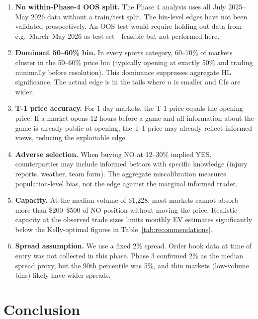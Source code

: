 \documentclass[11pt,a4paper]{article}
\begin{document}
\begin{enumerate}[leftmargin=*]

\item \textbf{No within-Phase-4 OOS split.} The Phase 4 analysis uses all
July 2025--May 2026 data without a train/test split.
The bin-level edges have not been validated prospectively.
An OOS test would require holding out data from e.g.\ March--May 2026 as
test set---feasible but not performed here.

\item \textbf{Dominant 50--60\% bin.} In every sports category, 60--70\% of
markets cluster in the 50--60\% price bin (typically opening at exactly 50\%
and trading minimally before resolution).
This dominance suppresses aggregate HL significance.
The actual edge is in the tails where $n$ is smaller and CIs are wider.

\item \textbf{T-1 price accuracy.} For 1-day markets, the T-1 price equals
the opening price. If a market opens 12 hours before a game and all
information about the game is already public at opening, the T-1 price may
already reflect informed views, reducing the exploitable edge.

\item \textbf{Adverse selection.} When buying NO at 12--30\% implied YES,
counterparties may include informed bettors with specific knowledge (injury
reports, weather, team form).
The aggregate miscalibration measures population-level bias, not the edge
against the marginal informed trader.

\item \textbf{Capacity.} At the median volume of \$1{,}228, most markets cannot
absorb more than \$200--\$500 of NO position without moving the price.
Realistic capacity at the observed trade sizes limits monthly EV estimates
significantly below the Kelly-optimal figures in Table~\ref{tab:recommendations}.

\item \textbf{Spread assumption.} We use a fixed 2\% spread.
Order book data at time of entry was not collected in this phase.
Phase 3 confirmed 2\% as the median spread proxy, but the 90th percentile
was 5\%, and thin markets (low-volume bins) likely have wider spreads.

\end{enumerate}

\section{Conclusion}
\end{document}
